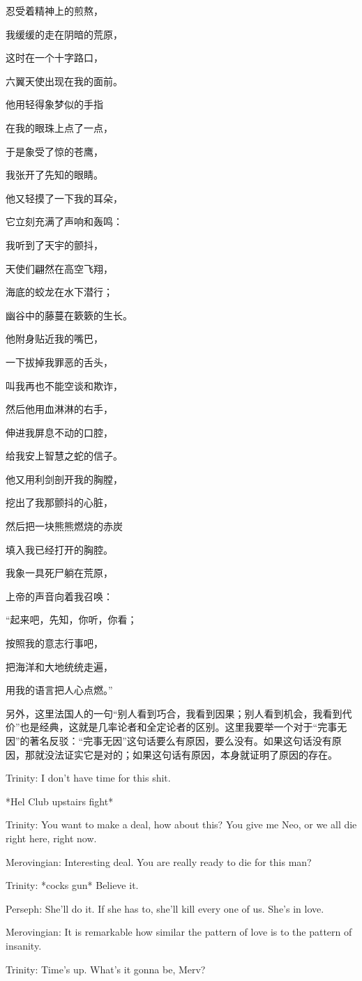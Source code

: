 \documentclass[UTF8]{ctexart}
\newenvironment{myquote}{\color{green} \setlength{\leftskip}{6em} \setlength{\rightskip}{4em} \setlength{\parindent}{-2em}}{\par}
\begin{document}
{\centering \it

忍受着精神上的煎熬，

我缓缓的走在阴暗的荒原，

这时在一个十字路口，

六翼天使出现在我的面前。

他用轻得象梦似的手指

在我的眼珠上点了一点，

于是象受了惊的苍鹰，

我张开了先知的眼睛。

他又轻摸了一下我的耳朵，

它立刻充满了声响和轰鸣：

我听到了天宇的颤抖，

天使们翩然在高空飞翔，

海底的蛟龙在水下潜行；

幽谷中的藤蔓在簌簌的生长。

他附身贴近我的嘴巴，

一下拔掉我罪恶的舌头，

叫我再也不能空谈和欺诈，

然后他用血淋淋的右手，

伸进我屏息不动的口腔，

给我安上智慧之蛇的信子。

他又用利剑剖开我的胸膛，

挖出了我那颤抖的心脏，

然后把一块熊熊燃烧的赤炭

填入我已经打开的胸腔。

我象一具死尸躺在荒原，

上帝的声音向着我召唤：

“起来吧，先知，你听，你看；

按照我的意志行事吧，

把海洋和大地统统走遍，

用我的语言把人心点燃。”

}

另外，这里法国人的一句“别人看到巧合，我看到因果；别人看到机会，我看到代价”也是经典，这就是几率论者和全定论者的区别。这里我要举一个对于“完事无因”的著名反驳：“完事无因”这句话要么有原因，要么没有。如果这句话没有原因，那就没法证实它是对的；如果这句话有原因，本身就证明了原因的存在。

\begin{myquote}
Trinity: I don't have time for this shit.

*Hel Club upstairs fight*

Trinity: You want to make a deal, how about this? You give me Neo, or we all die right here, right now.

Merovingian: Interesting deal. You are really ready to die for this man?

Trinity: *cocks gun* Believe it.

Perseph: She'll do it. If she has to, she'll kill every one of us. She's in love.

Merovingian: It is remarkable how similar the pattern of love is to the pattern of insanity.

Trinity: Time's up. What's it gonna be, Merv?
\end{myquote}
\end{document}
